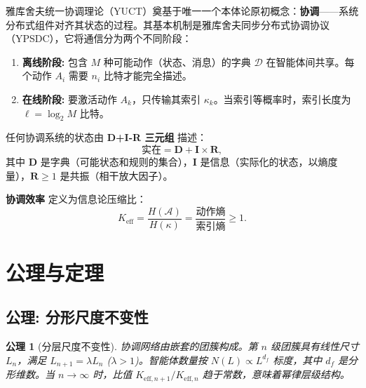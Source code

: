 \documentclass[12pt,a4paper]{article}
\newcommand{\Keff}{K_{\mathrm{eff}}}
\newtheorem{axiom}[theorem]{公理}
\begin{document}
	雅库舍夫统一协调理论（YUCT）奠基于唯一一个本体论原初概念：\textbf{协调}——系统分布式组件对齐其状态的过程。其基本机制是雅库舍夫同步分布式协调协议（YPSDC），它将通信分为两个不同阶段：
	\begin{enumerate}
		\item \textbf{离线阶段:} 包含 \(M\) 种可能动作（状态、消息）的字典 \(\mathcal{D}\) 在智能体间共享。每个动作 \(A_i\) 需要 \(n_i\) 比特才能完全描述。
		\item \textbf{在线阶段:} 要激活动作 \(A_k\)，只传输其索引 \(\kappa_k\)。当索引等概率时，索引长度为 \(\ell = \log_2 M\) 比特。
	\end{enumerate}
	
	任何协调系统的状态由 \textbf{D+I-R 三元组} 描述：
	\[
	\text{实在} = \mathbf{D} + \mathbf{I} \times \mathbf{R},
	\]
	其中 \(\mathbf{D}\) 是字典（可能状态和规则的集合），\(\mathbf{I}\) 是信息（实际化的状态，以熵度量），\(\mathbf{R} \ge 1\) 是共振（相干放大因子）。
	
	\textbf{协调效率} 定义为信息论压缩比：
	\begin{equation}
		\Keff = \frac{H(\mathcal{A})}{H(\kappa)} = \frac{\text{动作熵}}{\text{索引熵}} \ge 1.
		\label{eq:keff-def}
	\end{equation}
	
	\begin{center}
	\end{center}
	
	\section{公理与定理}
	\label{sec:axioms}
	
	\subsection{公理: 分形尺度不变性}
	
	\begin{axiom}[分层尺度不变性] \label{ax:A1}
		协调网络由嵌套的团簇构成。第 \(n\) 级团簇具有线性尺寸 \(L_n\)，满足 \(L_{n+1} = \lambda L_n\) (\(\lambda > 1\))。智能体数量按 \(N(L) \propto L^{d_f}\) 标度，其中 \(d_f\) 是分形维数。当 \(n \to \infty\) 时，比值 \(K_{\mathrm{eff},n+1}/K_{\mathrm{eff},n}\) 趋于常数，意味着幂律层级结构。
	\end{axiom}
	
\end{document}

